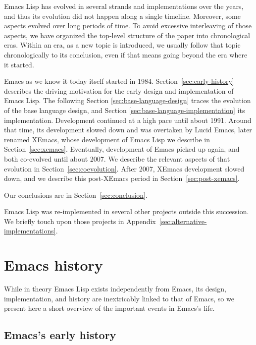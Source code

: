 \documentclass[format=acmsmall, review]{acmart}
\newcommand \Elisp {Emacs Lisp}
\begin{document}
\Elisp{} has evolved in several strands and implementations over the
years, and thus its evolution did not happen along a single timeline.
Moreover, some aspects evolved over long periods of time.  To avoid
excessive interleaving of those aspects, we have organized the
top-level structure of the paper into chronological eras.  Within an
era, as a new topic is introduced, we usually follow that topic
chronologically to its conclusion, even if that means going beyond the
era where it started.

Emacs as we know it today itself started in 1984.
Section~\ref{sec:early-history} describes the driving motivation for
the early design and implementation of \Elisp.  The following Section
\ref{sec:base-language-design} traces the evolution of the base
language design, and Section \ref{sec:base-language-implementation}
its implementation.
Development continued at a high pace until about 1991.
Around that time, its development slowed down and
was overtaken by Lucid Emacs, later renamed XEmacs, whose development of
\Elisp{} we describe in Section~\ref{sec:xemacs}.  Eventually,
development of Emacs picked up again, and both co-evolved until about
2007.  We describe the relevant aspects of that evolution in
Section~\ref{sec:coevolution}.  After 2007, XEmacs development slowed
down, and we describe this post-XEmacs period in
Section~\ref{sec:post-xemacs}.

Our conclusions are in
Section~\ref{sec:conclusion}.

\Elisp{} was re-implemented in several other projects outside this
succession.  We briefly touch upon those projects in
Appendix~\ref{sec:alternative-implementations}.  

\section{Emacs history}
\label{sec:emacs-history}

While in theory \Elisp{} exists independently from Emacs, its design,
implementation, and history are inextricably linked to that of Emacs, so we
present here a short overview of the important events in Emacs's life.

\subsection{Emacs's early history}
\label{sec:emacs-early-history}
\end{document}
